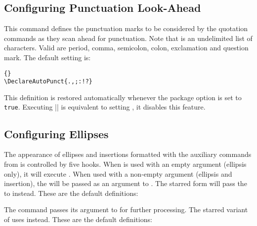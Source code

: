\documentclass{ltxdockit}[2010/09/26]
\begin{document}
\subsection{Configuring Punctuation Look-Ahead}
\label{cfg:dap}

\begin{ltxsyntax}


This command defines the punctuation marks to be considered by the quotation commands as they scan ahead for punctuation. Note that  is an undelimited list of characters. Valid  are period, comma, semicolon, colon, exclamation and question mark. The default setting is:

\begin{lstlisting}[style=latex]{}
\DeclareAutoPunct{.,;:!?}
\end{lstlisting}
%
This definition is restored automatically whenever the  package option is set to \texttt{true}. Executing |\DeclareAutoPunctuation{}| is equivalent to setting , \ie it disables this feature.

\end{ltxsyntax}

\subsection{Configuring Ellipses}
\label{cfg:elp}

The appearance of ellipses and insertions formatted with the auxiliary commands from  is controlled by five hooks. When  is used with an empty argument (ellipsis only), it will execute . When used with a non-empty  argument (ellipsis and insertion), the  will be passed as an argument to . The starred form will pass the  to  instead. These are the default definitions:

\begin{ltxcode}[showspaces=true]
\newcommand{<<\mktextelp>>}{[\textellipsis\unkern]}
\newcommand{<<\mktextelpins>>}[1]{[\textellipsis\unkern] [#1]}
\newcommand{<<\mktextinselp>>}[1]{[#1] [\textellipsis\unkern]}
\end{ltxcode}
%
The  command passes its  argument to  for further processing. The starred variant of  uses  instead. These are the default definitions:
\end{document}
